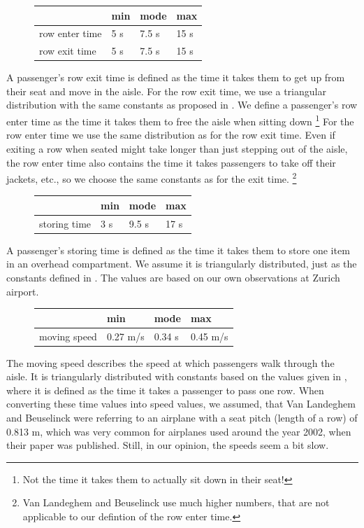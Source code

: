 \documentclass[11pt]{article}
\begin{document}
\begin{figure}[h!]
	\center
\begin{tabular}{l|l l l}

	&min &mode&max \\
	\hline
row enter time & 5 s &7.5 s & 15 s \\
	\hline
	row exit time& 5 s &7.5 s & 15 s \\
	\hline
\end{tabular}
\end{figure}
A passenger's row exit time is defined as the time it takes them to get up from their seat and move in the aisle. For the row exit time, we use a triangular distribution with the same constants as proposed in \cite{beus}. We define a passenger's row enter time as the time it takes them to free the aisle when sitting down \footnote{Not the time it takes them to actually sit down in their seat!} For the row enter time we use the same distribution as for the row exit time. Even if exiting a row when seated might take longer than just stepping out of the aisle, the row enter time also contains the time it takes passengers to take off their jackets, etc., so we choose the same constants as for the exit time. \footnote{Van Landeghem and Beuselinck use much higher numbers, that are not applicable to our defintion of the row enter time.}

\begin{figure}[h!]
	\center
\begin{tabular}{l|l l l}

	&min &mode&max \\
	\hline
storing time & 3 s &9.5 s & 17 s \\
	\hline

	\end{tabular}
\end{figure}
A passenger's storing time is defined as the time it takes them to store one item in an overhead compartment. We assume it is triangularly distributed, just as the constants defined in \cite{beus}. The values are based on our own observations at Zurich airport.

\begin{figure}[h!]
	\center
\begin{tabular}{l|l l l}

	&min &mode&max \\
	\hline
moving speed &0.27 m/s&0.34 s& 0.45 m/s   \\
	\hline
\end{tabular}
\end{figure}
The moving speed describes the speed at which passengers walk through the aisle. It is triangularly distributed with constants based on the values given in \cite{beus}, where it is defined as the time it takes a passenger to pass one row. When converting these time values into speed values, we assumed, that Van Landeghem and Beuselinck were referring to an airplane with a seat pitch (length of a row) of 0.813 m, which was very common for airplanes used around the year 2002, when their paper was published. Still, in our opinion, the speeds seem a bit slow.
\end{document}

